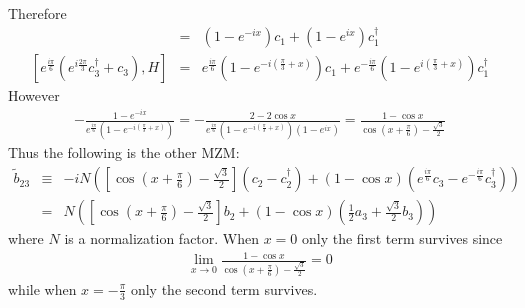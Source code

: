 \documentclass[aps,physrev,amsmath,amssymb]{revtex4-2}
\begin{document}
Therefore
\begin{eqnarray}
	[c_2 - c_2^\dag, H] &=& (1-e^{-ix})c_1 + (1-e^{ix})c_1^\dag\\\nonumber
	[e^{\frac{i\pi}{6}}\left(e^{i\frac{2\pi}{3}} c_3^\dag + c_3\right), H] & = &  e^{\frac{i\pi}{6}} (1-e^{-i\left(\frac{\pi}{3} + x\right)})c_1 + e^{-\frac{i\pi}{6}}( 1- e^{i\left(\frac{\pi}{3} + x\right)})c_1^\dag
\end{eqnarray}
However
\begin{eqnarray}
-\frac{1-e^{-ix}}{e^{\frac{i\pi}{6}} (1-e^{-i\left(\frac{\pi}{3} + x\right)})} = - \frac{2-2\cos x}{e^{\frac{i\pi}{6}} (1-e^{-i\left(\frac{\pi}{3} + x\right)})(1-e^{ix})} = \frac{1-\cos x}{\cos\left( x+ \frac{\pi}{6}\right)-\frac{\sqrt{3}}{2}}
\end{eqnarray}
Thus the following is the other MZM:
\begin{eqnarray}
	\tilde{b}_{23} &\equiv& -iN\left(\left[\cos\left( x+ \frac{\pi}{6}\right)-\frac{\sqrt{3}}{2}\right](c_2 - c_2^\dag) + (1-\cos x) \left( e^{\frac{i\pi}{6}} c_3 -e^{-\frac{i\pi}{6}} c_3^\dag\right)\right)\\\nonumber
	&=& N\left(\left[\cos\left( x+ \frac{\pi}{6}\right)-\frac{\sqrt{3}}{2}\right]b_2 + (1-\cos x)\left( \frac{1}{2} a_3 + \frac{\sqrt{3}}{2} b_3\right)\right)
\end{eqnarray}
where $N$ is a normalization factor. When $x=0$ only the first term survives since
\begin{eqnarray}
\lim_{x\rightarrow 0} \frac{1-\cos x}{\cos\left( x+ \frac{\pi}{6}\right)-\frac{\sqrt{3}}{2}} = 0 
\end{eqnarray}
while when $x = -\frac{\pi}{3}$ only the second term survives.
\end{document}
